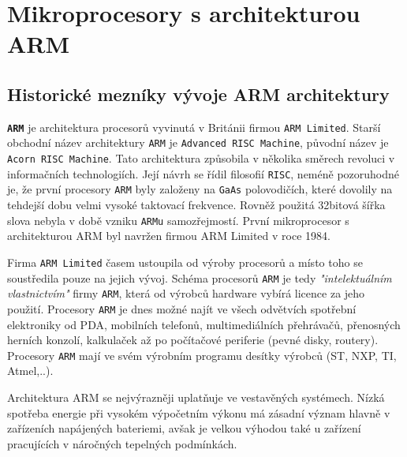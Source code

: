 {
\chapter{Mikroprocesory s architekturou ARM }

\section{Historické mezníky vývoje ARM architektury}
  \textbf{\texttt{ARM}} je architektura procesorů vyvinutá v Británii firmou \texttt{ARM Limited}. 
  Starší obchodní název architektury \texttt{ARM} je \texttt{Advanced RISC Machine}, původní název 
  je \texttt{Acorn RISC Machine}. Tato architektura způsobila v několika směrech revoluci v 
  informačních technologiích. Její návrh se řídil filosofií \texttt{RISC}, neméně pozoruhodné je, 
  že první procesory \texttt{ARM} byly založeny na \texttt{GaAs} polovodičích, které dovolily na 
  tehdejší dobu velmi vysoké taktovací frekvence. Rovněž použitá 32bitová šířka slova nebyla v době 
  vzniku \texttt{ARMu} samozřejmostí. První mikroprocesor s architekturou ARM byl navržen firmou 
  ARM Limited v roce 1984.
  
  Firma \texttt{ARM Limited} časem ustoupila od výroby procesorů a místo toho se soustředila pouze 
  na jejich vývoj. Schéma procesorů \texttt{ARM} je tedy \emph{"intelektuálním vlastnictvím"} firmy 
  \texttt{ARM}, která od výrobců hardware vybírá licence za jeho použití. Procesory \texttt{ARM} je 
  dnes možné najít ve všech odvětvích spotřební elektroniky od PDA, mobilních telefonů, 
  multimediálních přehrávačů, přenosných herních konzolí, kalkulaček až po počítačové periferie 
  (pevné disky, routery). Procesory \texttt{ARM} mají ve svém výrobním programu desítky výrobců 
  (ST, NXP, TI, Atmel,..).
  
  Architektura ARM se nejvýrazněji uplatňuje ve vestavěných systémech. Nízká spotřeba energie při 
  vysokém výpočetním výkonu má zásadní význam hlavně v zařízeních napájených bateriemi, avšak je 
  velkou výhodou také u zařízení pracujících v náročných tepelných podmínkách.
  
}
